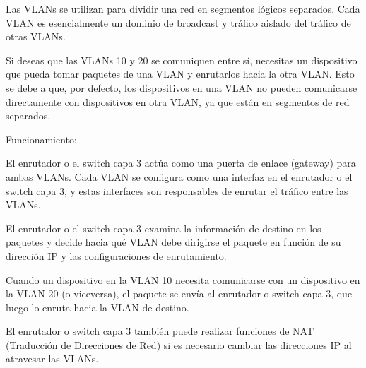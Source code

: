 \documentclass[a4paper]{article}
\begin{document}
\begin{enumerate}
Las VLANs se utilizan para dividir una red en segmentos lógicos separados. Cada VLAN es esencialmente un dominio de broadcast y tráfico aislado del tráfico de otras VLANs.

Si deseas que las VLANs 10 y 20 se comuniquen entre sí, necesitas un dispositivo que pueda tomar paquetes de una VLAN y enrutarlos hacia la otra VLAN. Esto se debe a que, por defecto, los dispositivos en una VLAN no pueden comunicarse directamente con dispositivos en otra VLAN, ya que están en segmentos de red separados.

Funcionamiento:

El enrutador o el switch capa 3 actúa como una puerta de enlace (gateway) para ambas VLANs. Cada VLAN se configura como una interfaz en el enrutador o el switch capa 3, y estas interfaces son responsables de enrutar el tráfico entre las VLANs.

El enrutador o el switch capa 3 examina la información de destino en los paquetes y decide hacia qué VLAN debe dirigirse el paquete en función de su dirección IP y las configuraciones de enrutamiento.

Cuando un dispositivo en la VLAN 10 necesita comunicarse con un dispositivo en la VLAN 20 (o viceversa), el paquete se envía al enrutador o switch capa 3, que luego lo enruta hacia la VLAN de destino.

El enrutador o switch capa 3 también puede realizar funciones de NAT (Traducción de Direcciones de Red) si es necesario cambiar las direcciones IP al atravesar las VLANs.


\end{enumerate}
\end{document}
